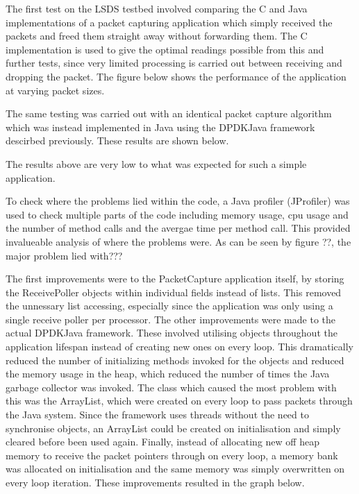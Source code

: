 \documentclass[final_report.tex]{subfiles}
\begin{document}
The first test on the LSDS testbed involved comparing the C and Java implementations of a packet capturing application which simply received the packets and freed them straight away without forwarding them. The C implementation is used to give the optimal readings possible from this and further tests, since very limited processing is carried out between receiving and dropping the packet. The figure below shows the performance of the application at varying packet sizes.



The same testing was carried out with an identical packet capture algorithm which was instead implemented in Java using the DPDKJava framework descirbed previously. These results are shown below.


The results above are very low to what was expected for such a simple application. 

To check where the problems lied within the code, a Java profiler (JProfiler) was used to check multiple parts of the code including memory usage, cpu usage and the number of method calls and the avergae time per method call. This provided invalueable analysis of where the problems were. As can be seen by figure ??, the major problem lied with???


The first improvements were to the PacketCapture application itself, by storing the ReceivePoller objects within individual fields instead of lists. This removed the unnessary list accessing, especially since the application was only using a single receive poller per processor. The other improvements were made to the actual DPDKJava framework. These involved utilising objects throughout the application lifespan instead of creating new ones on every loop. This dramatically reduced the number of initializing methods invoked for the objects and reduced the memory usage in the heap, which reduced the number of times the Java garbage collector was invoked. The class which caused the most problem with this was the ArrayList, which were created on every loop to pass packets through the Java system. Since the framework uses threads without the need to synchronise objects, an ArrayList could be created on initialisation and simply cleared before been used again. Finally, instead of allocating new off heap memory to receive the packet pointers through on every loop, a memory bank was allocated on initialisation and the same memory was simply overwritten on every loop iteration. These improvements resulted in the graph below.
\end{document}
